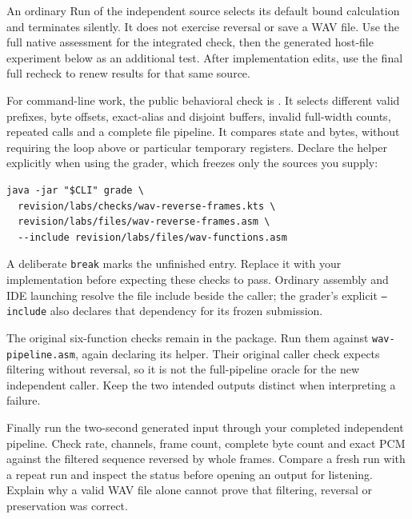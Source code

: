 An ordinary Run of the independent source selects its default bound calculation
and terminates silently. It does not exercise reversal or save a WAV file.
Use the full native assessment for the integrated check, then the generated
host-file experiment below as an additional test. After implementation edits,
use the final full recheck to renew results for that same source.

For command-line work, the public behavioral check is
. It selects different valid
prefixes, byte offsets, exact-alias and disjoint buffers, invalid full-width
counts, repeated calls and a complete file pipeline. It compares state and
bytes, without requiring the loop above or particular temporary registers.
Declare the helper explicitly when using the grader, which freezes only the
sources you supply:
\begin{Verbatim}
java -jar "$CLI" grade \
  revision/labs/checks/wav-reverse-frames.kts \
  revision/labs/files/wav-reverse-frames.asm \
  --include revision/labs/files/wav-functions.asm
\end{Verbatim}
A deliberate \texttt{break} marks the unfinished entry. Replace it with your
implementation before expecting these checks to pass. Ordinary assembly and
IDE launching resolve the file include beside the caller; the grader's explicit
\texttt{--include} also declares that dependency for its frozen submission.

The original six-function checks remain in the package. Run them against
\texttt{wav-pipeline.asm}, again declaring its helper. Their original caller
check expects filtering without reversal, so it is not the full-pipeline oracle
for the new independent caller. Keep the two intended outputs distinct when
interpreting a failure.

Finally run the two-second generated input through your completed independent
pipeline. Check rate, channels, frame count, complete byte count and exact PCM
against the filtered sequence reversed by whole frames. Compare a fresh run
with a repeat run and inspect the status before opening an output for listening.
Explain why a valid WAV file alone cannot prove that filtering, reversal or
preservation was correct.
